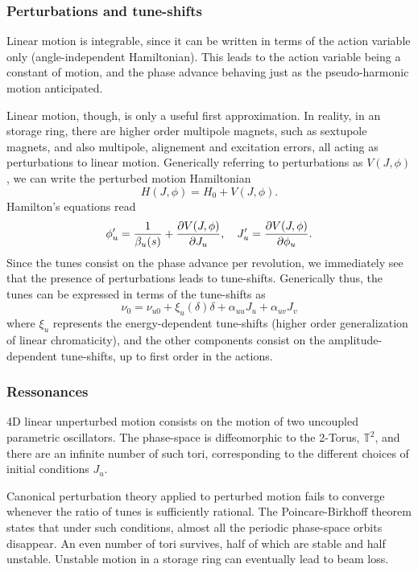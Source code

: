 \subsubsection{Perturbations and tune-shifts}
Linear motion is integrable, since it can be written in terms of the action variable only (angle-independent Hamiltonian). This leads to the action variable being a constant of motion, and the phase advance behaving just as the pseudo-harmonic motion anticipated.

Linear motion, though, is only a useful first approximation. In reality, in an storage ring, there are higher order multipole magnets, such as sextupole magnets, and also multipole, alignement and excitation errors, all acting as perturbations to linear motion. Generically referring to perturbations as $V(J, \phi)$, we can write the perturbed motion Hamiltonian
\begin{equation}
    H(J,\phi) =H_0 + V(J,\phi).
\end{equation}
Hamilton's equations read
\begin{equation}
\phi_u^\prime = \frac{1}{\beta_u(s)}+\pdv{V(J,\phi)}{J_u}, \quad J_u^\prime = \pdv{V(J,\phi)}{\phi_u}.
\end{equation}
Since the tunes consist on the phase advance per revolution, we immediately see that the presence of perturbations leads to tune-shifts. Generically thus, the tunes can be expressed in terms of the tune-shifts as
$$\nu_0 = \nu_{u0} + \xi_u(\delta) \delta + \alpha_{uu} J_u + \alpha_{uv} J_v$$
where $\xi_u$ represents the energy-dependent tune-shifts (higher order generalization of linear chromaticity), and the other components consist on the amplitude-dependent tune-shifts, up to first order in the actions.


\subsubsection{Ressonances}
4D linear unperturbed motion consists on the motion of two uncoupled parametric oscillators. The phase-space is diffeomorphic to the 2-Torus, $\mathbb{T}^2$, and there are an infinite number of such tori, corresponding to the different choices of initial conditions $J_u$.

Canonical perturbation theory applied to perturbed motion fails to converge whenever the ratio of tunes is sufficiently rational. The Poincare-Birkhoff theorem states that under such conditions, almost all the periodic phase-space orbits disappear. An even number of tori survives, half of which are stable and half unstable. Unstable motion in a storage ring can eventually lead to beam loss.

